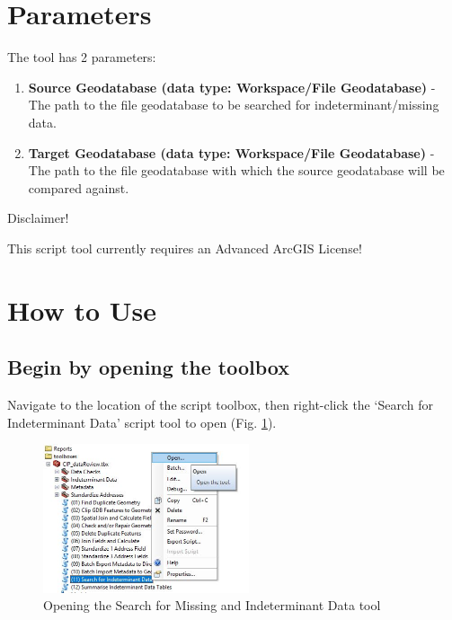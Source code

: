 \documentclass[openany]{book}
\providecommand{\tightlist}{%
  \setlength{\itemsep}{0pt}\setlength{\parskip}{0pt}}
\theoremstyle{definition}
\theoremstyle{definition}
\theoremstyle{definition}
\theoremstyle{remark}
\let\BeginKnitrBlock\begin \let\EndKnitrBlock\end
\begin{document}
\section{Parameters}\label{parameters-9}

The tool has 2 parameters:

\begin{enumerate}
\def\labelenumi{\arabic{enumi}.}
\tightlist
\item
  \textbf{Source Geodatabase (data type: Workspace/File Geodatabase)} -
  The path to the file geodatabase to be searched for
  indeterminant/missing data.
\item
  \textbf{Target Geodatabase (data type: Workspace/File Geodatabase)} -
  The path to the file geodatabase with which the source geodatabase
  will be compared against.
\end{enumerate}

\BeginKnitrBlock{warnh1}
Disclaimer!
\EndKnitrBlock{warnh1} \BeginKnitrBlock{warnp}

This script tool currently requires an Advanced ArcGIS License!
\EndKnitrBlock{warnp}

\section{How to Use}\label{how-to-use-9}

\subsection{Begin by opening the
toolbox}\label{begin-by-opening-the-toolbox-9}

Navigate to the location of the script toolbox, then right-click the
`Search for Indeterminant Data' script tool to open (Fig.
\ref{fig:indtSearchopen}).

\begin{figure}[H]

{\centering \includegraphics[width=2.39in,]{figures/indtSearch-open} 

}

\caption{Opening the Search for Missing and Indeterminant Data tool}\label{fig:indtSearchopen}
\end{figure}
\end{document}
